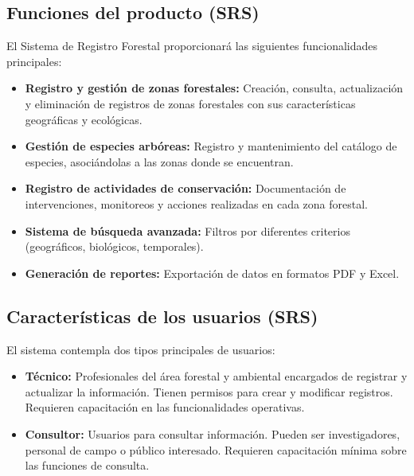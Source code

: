 \subsection{Funciones del producto (SRS)}
\label{srs:funciones}
El Sistema de Registro Forestal proporcionará las siguientes funcionalidades principales:
\begin{itemize}
\item \textbf{Registro y gestión de zonas forestales:} Creación, consulta, actualización y eliminación de registros de zonas forestales con sus características geográficas y ecológicas.
\item \textbf{Gestión de especies arbóreas:} Registro y mantenimiento del catálogo de especies, asociándolas a las zonas donde se encuentran.
\item \textbf{Registro de actividades de conservación:} Documentación de intervenciones, monitoreos y acciones realizadas en cada zona forestal.
\item \textbf{Sistema de búsqueda avanzada:} Filtros por diferentes criterios (geográficos, biológicos, temporales).
\item \textbf{Generación de reportes:} Exportación de datos en formatos PDF y Excel.
\end{itemize}

\subsection{Características de los usuarios (SRS)}
\label{srs:usuarios}
El sistema contempla dos tipos principales de usuarios:
\begin{itemize}
\item \textbf{Técnico:} Profesionales del área forestal y ambiental encargados de registrar y actualizar la información. Tienen permisos para crear y modificar registros. Requieren capacitación en las funcionalidades operativas.
\item \textbf{Consultor:} Usuarios para consultar información. Pueden ser investigadores, personal de campo o público interesado. Requieren capacitación mínima sobre las funciones de consulta.
\end{itemize}

